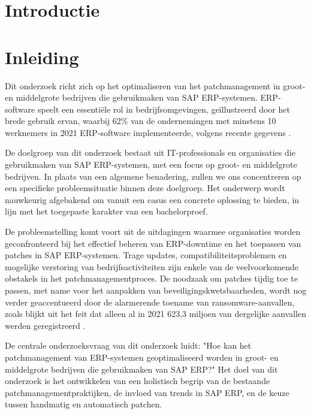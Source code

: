 
\section{Introductie}%
\label{sec:introductie}
\section{Inleiding}

Dit onderzoek richt zich op het optimaliseren van het patchmanagement in groot- en middelgrote bedrijven die gebruikmaken van SAP ERP-systemen. ERP-software speelt een essentiële rol in bedrijfsomgevingen, geïllustreerd door het brede gebruik ervan, waarbij 62\% van de ondernemingen met minstens 10 werknemers in 2021 ERP-software implementeerde, volgens recente gegevens \autocite{StatistiekVlaanderen2022}.

De doelgroep van dit onderzoek bestaat uit IT-professionals en organisaties die gebruikmaken van SAP ERP-systemen, met een focus op groot- en middelgrote bedrijven. In plaats van een algemene benadering, zullen we ons concentreren op een specifieke probleemsituatie binnen deze doelgroep. Het onderwerp wordt nauwkeurig afgebakend om vanuit een casus een concrete oplossing te bieden, in lijn met het toegepaste karakter van een bachelorproef.

De probleemstelling komt voort uit de uitdagingen waarmee organisaties worden geconfronteerd bij het effectief beheren van ERP-downtime en het toepassen van patches in SAP ERP-systemen. Trage updates, compatibiliteitsproblemen en mogelijke verstoring van bedrijfsactiviteiten zijn enkele van de veelvoorkomende obstakels in het patchmanagementproces. De noodzaak om patches tijdig toe te passen, met name voor het aanpakken van beveiligingskwetsbaarheden, wordt nog verder geaccentueerd door de alarmerende toename van ransomware-aanvallen, zoals blijkt uit het feit dat alleen al in 2021 623,3 miljoen van dergelijke aanvallen werden geregistreerd \autocite{Griffiths2022}.

De centrale onderzoeksvraag van dit onderzoek luidt: "Hoe kan het patchmanagement van ERP-systemen geoptimaliseerd worden in groot- en middelgrote bedrijven die gebruikmaken van SAP ERP?" Het doel van dit onderzoek is het ontwikkelen van een holistisch begrip van de bestaande patchmanagementpraktijken, de invloed van trends in SAP ERP, en de keuze tussen handmatig en automatisch patchen. 

